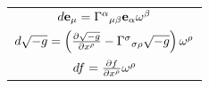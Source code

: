 \documentclass[12pt]{article}
\newcommand{\Bv}[1]  {\ensuremath{\idx{\op{e}}  {\dn{#1}}} }
\newcommand{\Bf}[1]  {\ensuremath{\idx{\op{\gw}}{\up{#1}}} }
\newcommand{\Chr}[3] {\ensuremath{\idx{\gG}{\up{#1}\dn{#2 #3}}} }
\begin{document}
\begin{tabular}{|c|}
  $d \Bv{\gm} = \Chr{\ga}{\gm}{\gb} \Bv{\ga} \Bf{\gb}$ \\
  $d \sqrt{-g} = \surp{ \pdxby{\sqrt{-g}}{x^{\gr}} - \Chr{\gs}{\gs}{\gr} \sqrt{-g} } \Bf{\gr}$ \\
  $d f = \pdxby{f}{x^\gr} \Bf{\gr}$ \\ \hline
\end{tabular}
\end{document}
